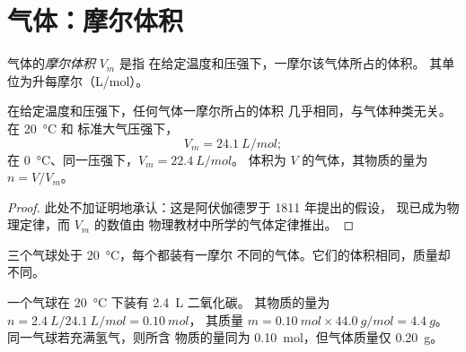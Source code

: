 \section{气体：摩尔体积}

\begin{definition}[摩尔体积]\label{def:g10:the-mole:molar-volume}
气体的\emph{摩尔体积} $V_m$ 是指
在给定温度和压强下，一摩尔该气体所占的体积。
其单位为升每摩尔（\si{L/mol}）。
\end{definition}

\begin{proposition}[所有气体的摩尔体积相同]\label{prop:g10:the-mole:avogadro-law}
在给定温度和压强下，任何气体一摩尔所占的体积
几乎相同，与气体种类无关。在 \qty{20}{\celsius} 和
标准大气压强下，
\[
  V_m = \qty{24.1}{L/mol};
\]
在 \qty{0}{\celsius}、同一压强下，$V_m = \qty{22.4}{L/mol}$。
体积为 $V$ 的气体，其物质的量为 $n = V / V_m$。
\end{proposition}

\begin{proof}
此处不加证明地承认：这是阿伏伽德罗于 1811 年提出的假设，
现已成为物理定律，而 $V_m$ 的数值由
物理教材中所学的气体定律推出。
\end{proof}

\begin{omfigure}

{\small 三个气球处于 \qty{20}{\celsius}，每个都装有一摩尔
不同的气体。它们的体积相同，质量却不同。}
\end{omfigure}


\begin{example}[一个装有二氧化碳的气球]\label{ex:g10:the-mole:balloon}
一个气球在 \qty{20}{\celsius} 下装有 \qty{2.4}{L} 二氧化碳。
其物质的量为 $n = \qty{2.4}{L} / \qty{24.1}{L/mol} = \qty{0.10}{mol}$，
其质量 $m = \qty{0.10}{mol} \times \qty{44.0}{g/mol} =
\qty{4.4}{g}$。同一气球若充满氢气，则所含
物质的量同为 \qty{0.10}{mol}，但气体质量仅 \qty{0.20}{g}。
\end{example}

